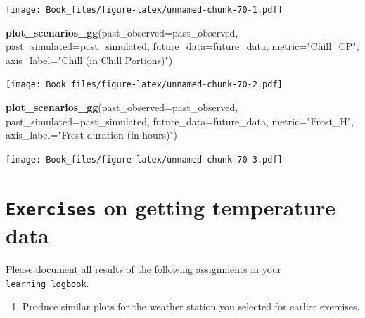 \documentclass[
]{book}
\newenvironment{Shaded}{\begin{snugshade}}{\end{snugshade}}
\newcommand{\DataTypeTok}[1]{\textcolor[rgb]{0.13,0.29,0.53}{#1}}
\newcommand{\KeywordTok}[1]{\textcolor[rgb]{0.13,0.29,0.53}{\textbf{#1}}}
\newcommand{\NormalTok}[1]{#1}
\newcommand{\StringTok}[1]{\textcolor[rgb]{0.31,0.60,0.02}{#1}}
\providecommand{\tightlist}{%
  \setlength{\itemsep}{0pt}\setlength{\parskip}{0pt}}
\begin{document}
\texttt{[image: Book\_files/figure-latex/unnamed-chunk-70-1.pdf]}

\begin{Shaded}
\begin{Highlighting}[]
\KeywordTok{plot_scenarios_gg}\NormalTok{(}\DataTypeTok{past_observed=}\NormalTok{past_observed,}
                  \DataTypeTok{past_simulated=}\NormalTok{past_simulated,}
                  \DataTypeTok{future_data=}\NormalTok{future_data,}
                  \DataTypeTok{metric=}\StringTok{"Chill_CP"}\NormalTok{,}
                  \DataTypeTok{axis_label=}\StringTok{"Chill (in Chill Portions)"}\NormalTok{)}
\end{Highlighting}
\end{Shaded}

\texttt{[image: Book\_files/figure-latex/unnamed-chunk-70-2.pdf]}

\begin{Shaded}
\begin{Highlighting}[]
\KeywordTok{plot_scenarios_gg}\NormalTok{(}\DataTypeTok{past_observed=}\NormalTok{past_observed,}
                  \DataTypeTok{past_simulated=}\NormalTok{past_simulated,}
                  \DataTypeTok{future_data=}\NormalTok{future_data,}
                  \DataTypeTok{metric=}\StringTok{"Frost_H"}\NormalTok{,}
                  \DataTypeTok{axis_label=}\StringTok{"Frost duration (in hours)"}\NormalTok{)}
\end{Highlighting}
\end{Shaded}

\texttt{[image: Book\_files/figure-latex/unnamed-chunk-70-3.pdf]}

\hypertarget{exercises_future_plots}{%
\section*{\texorpdfstring{\texttt{Exercises} on getting temperature data}{Exercises on getting temperature data}}\label{exercises_future_plots}}

Please document all results of the following assignments in your \texttt{learning\ logbook}.

\begin{enumerate}
\def\labelenumi{\arabic{enumi})}
\tightlist
\item
  Produce similar plots for the weather station you selected for earlier exercises.
\end{enumerate}
\end{document}
